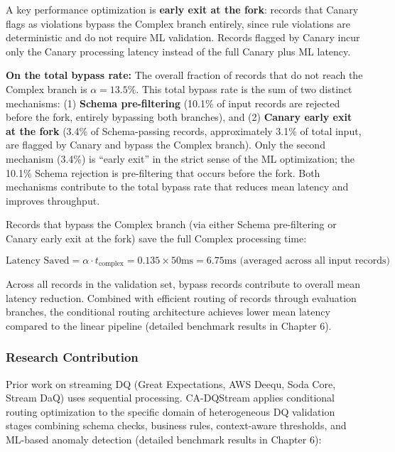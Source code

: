 A key performance optimization is \textbf{early exit at the fork}: records that Canary flags as violations bypass the Complex branch entirely, since rule violations are deterministic and do not require ML validation. Records flagged by Canary incur only the Canary processing latency instead of the full Canary plus ML latency.

\textbf{On the total bypass rate:} The overall fraction of records that do not reach the Complex branch is $\alpha = 13.5\%$. This total bypass rate is the sum of two distinct mechanisms: (1) \textbf{Schema pre-filtering} (10.1\% of input records are rejected before the fork, entirely bypassing both branches), and (2) \textbf{Canary early exit at the fork} (3.4\% of Schema-passing records, approximately 3.1\% of total input, are flagged by Canary and bypass the Complex branch). Only the second mechanism (3.4\%) is ``early exit'' in the strict sense of the ML optimization; the 10.1\% Schema rejection is pre-filtering that occurs before the fork. Both mechanisms contribute to the total bypass rate that reduces mean latency and improves throughput.

Records that bypass the Complex branch (via either Schema pre-filtering or Canary early exit at the fork) save the full Complex processing time:

\begin{equation}
\text{Latency Saved} = \alpha \cdot t_{\text{complex}} = 0.135 \times 50\text{ms} = 6.75\text{ms (averaged across all input records)}
\end{equation}

Across all records in the validation set, bypass records contribute to overall mean latency reduction.             Combined with efficient routing of records through evaluation branches, the conditional routing architecture achieves lower mean latency compared to the linear pipeline (detailed benchmark results in Chapter 6).

\subsubsection{Research Contribution}

Prior work on streaming DQ (Great Expectations, AWS Deequ, Soda Core, Stream DaQ) uses sequential processing. CA-DQStream applies conditional routing optimization to the specific domain of heterogeneous DQ validation stages combining schema checks, business rules, context-aware thresholds, and ML-based anomaly detection (detailed benchmark results in Chapter 6):

